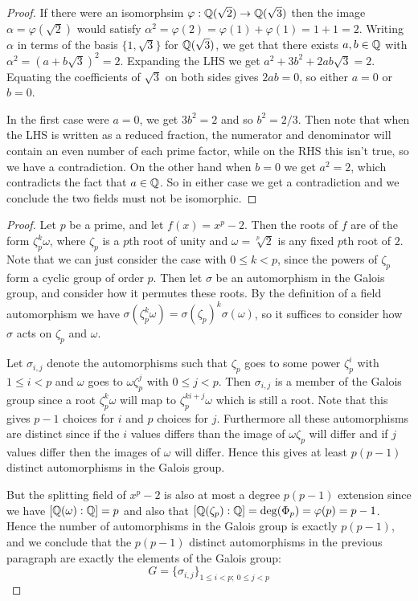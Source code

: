\documentclass[11pt]{article}
\begin{document}
\begin{proof}
  If there were an isomorphsim $\varphi: \mathbb{Q}(\sqrt{2}) \rightarrow \mathbb{Q}(\sqrt{3})$ then the image $\alpha = \varphi(\sqrt{2})$ would satisfy $\alpha^2 = \varphi(2) = \varphi(1) + \varphi(1) = 1 + 1 = 2$.
  Writing $\alpha$ in terms of the basis $\{1, \sqrt{3}\}$ for $\mathbb{Q}(\sqrt{3})$, we get that there exists $a,b \in \mathbb{Q}$ with $\alpha^2 = (a + b\sqrt{3})^2 = 2$. Expanding the LHS we get $a^2 + 3b^2 + 2ab\sqrt{3} = 2$. Equating the coefficients of $\sqrt{3}$ on both sides gives $2ab = 0$, so either $a = 0$ or $b = 0$.

  In the first case were $a = 0$, we get $3b^2 = 2$ and so $b^2 = 2/3$.
  Then note that when the LHS is written as a reduced fraction, the numerator and denominator will contain an even number of each prime factor, while on the RHS this isn't true, so we have a contradiction.
  On the other hand when $b = 0$ we get $a^2 = 2$, which contradicts the fact that $a \in \mathbb{Q}$. So in either case we get a contradiction and we conclude the two fields must not be isomorphic.
\end{proof}


\begin{proof}
  Let $p$ be a prime, and let $f(x) = x^p - 2$.
  Then the roots of $f$ are of the form $\zeta_p^k\omega$, where $\zeta_p$ is a $p$th root of unity and $\omega = \sqrt[p]{2}$ is any fixed $p$th root of $2$.
  Note that we can just consider the case with $0 \le k < p$, since the powers of $\zeta_p$ form a cyclic group of order $p$.
  Then let $\sigma$ be an automorphism in the Galois group, and consider how it permutes these roots.
  By the definition of a field automorphism we have $\sigma(\zeta_p^k\omega) = \sigma(\zeta_p)^k\sigma(\omega)$, so it suffices to consider how $\sigma$ acts on $\zeta_p$ and $\omega$.
  
  Let $\sigma_{i,j}$ denote the automorphisms such that $\zeta_p$ goes to some power $\zeta_p^i$ with $1 \le i < p$ and $\omega$ goes to $\omega\zeta_p^j$ with $0 \le j < p$.
  Then $\sigma_{i,j}$ is a member of the Galois group since a root $\zeta_p^k\omega$ will map to $\zeta_p^{ki + j}\omega$ which is still a root.
  Note that this gives $p-1$ choices for $i$ and $p$ choices for $j$.
  Furthermore all these automorphisms are distinct since if the $i$ values differs than the image of  $\omega\zeta_p$ will differ and if $j$ values differ then the images of $\omega$ will differ.
  Hence this gives at least $p(p-1)$ distinct automorphisms in the Galois group.
  
  But the splitting field of $x^p - 2$ is also at most a degree $p(p-1)$ extension since we have $[\mathbb{Q}(\omega):\mathbb{Q}] = p$ and also that $[\mathbb{Q}(\zeta_p):\mathbb{Q}] = \deg(\Phi_p) = \varphi(p) = p-1$.
  Hence the number of automorphisms in the Galois group is exactly $p(p-1)$, and we conclude that the $p(p-1)$ distinct automorphisms in the previous paragraph are exactly the elements of the Galois group:
  \begin{equation*}
    G = \{ \sigma_{i,j} \}_{1 \le i < p;\ 0 \le j < p}
  \end{equation*}
\end{proof}
\end{document}
